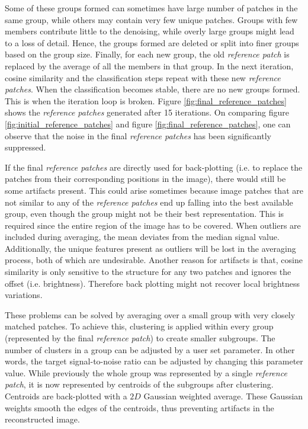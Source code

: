\documentclass[fleqn,10pt]{wlscirep}
\begin{document}
	Some of these groups formed can sometimes have large number of patches in the same group, while others may contain very few unique patches. Groups with few members contribute little to the denoising, while overly large groups might lead to a loss of detail. Hence, the groups formed are deleted or split into finer groups based on the group size. Finally, for each new group, the old \textit{reference patch} is replaced by the average of all the members in that group. In the next iteration, cosine similarity and the classification steps repeat with these new \textit{reference patches}. When the classification becomes stable, there are no new groups formed. This is when the iteration loop is broken. Figure \ref{fig:final_reference_patches} shows the \textit{reference patches} generated after 15 iterations. On comparing figure \ref{fig:initial_reference_patches} and figure \ref{fig:final_reference_patches}, one can observe that the noise in the final \textit{reference patches} has been significantly suppressed.


	
	If the final \textit{reference patches} are directly used for back-plotting (i.e. to replace the patches from their corresponding positions in the image), there would still be some artifacts present. This could arise sometimes because image patches that are not similar to any of the \textit{reference patches} end up falling into the best available group, even though the group might not be their best representation. This is required since the entire region of the image has to be covered. When outliers are included during averaging, the mean deviates from the median signal value. Additionally, the unique features present as outliers will be lost in the averaging process, both of which are undesirable. Another reason for artifacts is that, cosine similarity is only sensitive to the structure for any two patches and ignores the offset (i.e. brightness). Therefore back plotting might not recover local brightness variations.
	
	These problems can be solved by averaging over a small group with very closely matched patches. To achieve this, clustering is applied within every group (represented by the final \textit{reference patch}) to create smaller subgroups. The number of clusters in a group can be adjusted by a user set parameter. In other words, the target signal-to-noise ratio can be adjusted by changing this parameter value. While previously the whole group was represented by a single \textit{reference patch}, it is now represented by centroids of the subgroups after clustering. Centroids are back-plotted with a $2D$ Gaussian weighted average. These Gaussian weights smooth the edges of the centroids, thus preventing artifacts in the reconstructed image. 
	
\end{document}
